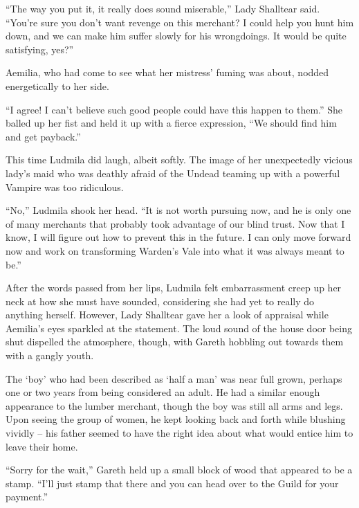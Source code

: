  

“The way you put it, it really does sound miserable,” Lady Shalltear said. “You’re sure you don’t want revenge on this merchant? I could help you hunt him down, and we can make him suffer slowly for his wrongdoings. It would be quite satisfying, yes?”

 

Aemilia, who had come to see what her mistress’ fuming was about, nodded energetically to her side.

 

“I agree! I can’t believe such good people could have this happen to them.” She balled up her fist and held it up with a fierce expression, “We should find him and get payback.”

 

This time Ludmila did laugh, albeit softly. The image of her unexpectedly vicious lady’s maid who was deathly afraid of the Undead teaming up with a powerful Vampire was too ridiculous.

 

“No,” Ludmila shook her head. “It is not worth pursuing now, and he is only one of many merchants that probably took advantage of our blind trust. Now that I know, I will figure out how to prevent this in the future. I can only move forward now and work on transforming Warden’s Vale into what it was always meant to be.”

 

After the words passed from her lips, Ludmila felt embarrassment creep up her neck at how she must have sounded, considering she had yet to really do anything herself. However, Lady Shalltear gave her a look of appraisal while Aemilia’s eyes sparkled at the statement. The loud sound of the house door being shut dispelled the atmosphere, though, with Gareth hobbling out towards them with a gangly youth.

 

The ‘boy’ who had been described as ‘half a man’ was near full grown, perhaps one or two years from being considered an adult. He had a similar enough appearance to the lumber merchant, though the boy was still all arms and legs. Upon seeing the group of women, he kept looking back and forth while blushing vividly – his father seemed to have the right idea about what would entice him to leave their home.

 

“Sorry for the wait,” Gareth held up a small block of wood that appeared to be a stamp. “I’ll just stamp that there and you can head over to the Guild for your payment.”

